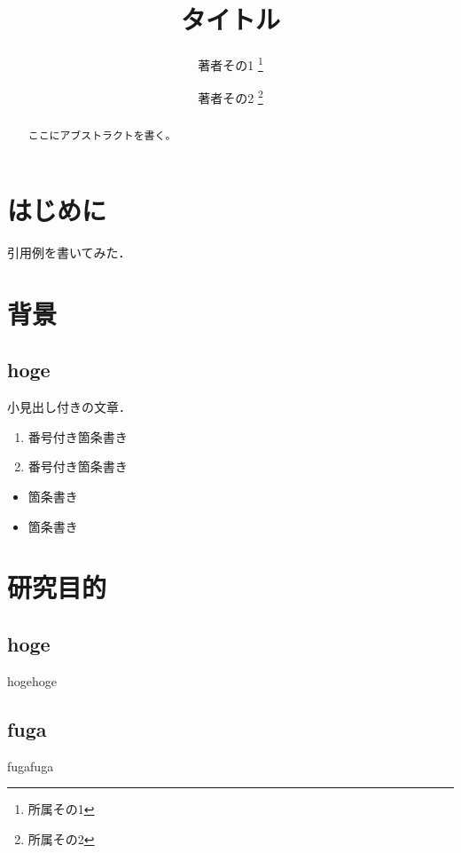 \documentclass[a4j,10pt]{jarticle}
\begin{document}

\title{タイトル}

\author{
    著者その1 \thanks{所属その1}
    \and
    著者その2 \thanks{所属その2}
}

\begin{abstract}
ここにアブストラクトを書く。
\end{abstract}

\maketitle
\thispagestyle{empty}

\section{はじめに}

引用例\cite{example}を書いてみた．

\section{背景}

\subsection{hoge}
小見出し付きの文章．

\begin{enumerate}
\item 番号付き箇条書き 
\item 番号付き箇条書き
\end{enumerate}

\begin{itemize}
\item 箇条書き
\item 箇条書き
\end{itemize}


\section{研究目的}

\subsection{hoge}
hogehoge
 
\subsection{fuga}
fugafuga
\end{document}
